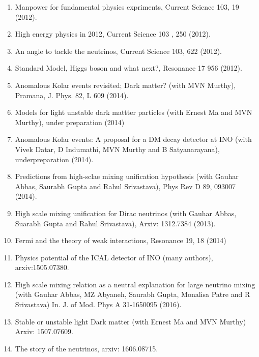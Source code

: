 \begin{enumerate}
\item Manpower for fundamental physics expriments, Current Science 103, 19 (2012).

\item High energy physics in 2012, Current Science 103 , 250 (2012).

\item An angle to tackle the neutrinos, Current Science 103, 622 (2012).

\item Standard Model, Higgs boson and what next?, Resonance 17 956 (2012).

\item Anomalous Kolar events revisited; Dark matter? (with MVN Murthy), Pramana, J. Phys. 82, L 609 (2014).

\item Models for light unstable dark mattter particles (with Ernest Ma and MVN Murthy), under preparation (2014)

\item Anomalous Kolar events: A proposal for a DM decay detector at INO (with Vivek Datar, D Indumathi, MVN Murthy and B Satyanarayana), underpreparation (2014).

\item Predictions from high-sclae mixing unification hypothesis (with Gauhar Abbas, Saurabh Gupta and Rahul Srivastava), Phys Rev D 89, 093007 (2014).

\item High scale mixing unification for Dirac neutrinos (with Gauhar Abbas, Suarabh Gupta and Rahul Srivastava), Arxiv: 1312.7384 (2013).

\item Fermi and the theory of weak interactions, Resonance 19, 18 (2014)

\item Physics potential of the ICAL detector of INO (many authors), arxiv:1505.07380.

\item High scale mixing relation as a neutral explanation for large neutrino mixing (with Gauhar Abbas, MZ Abyaneh, Saurabh Gupta, Monalisa Patre and R Srivastava) In. J. of Mod. Phys A 31-1650095 (2016).

\item Stable or unstable light Dark matter (with Ernest Ma and MVN Murthy) Arxiv: 1507.07609.

\item The story of the neutrinos, arxiv: 1606.08715.


\end{enumerate}
